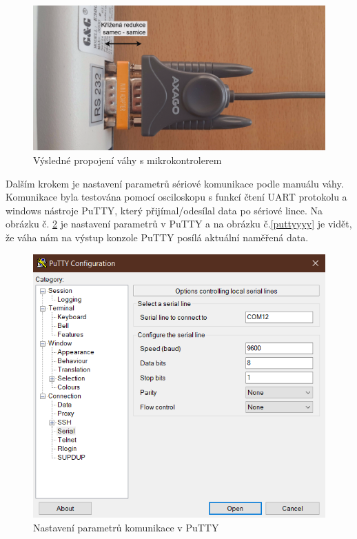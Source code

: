 \begin{figure}[H]
    \begin{center}
        \includegraphics[scale=0.27]{obrazky/zapojeni_vahy_v2 - popis.png}
    \end{center}
    \caption{Výsledné propojení váhy s mikrokontrolerem}
    \label{propojení váhy v2}
\end{figure}

Dalším krokem je nastavení parametrů sériové komunikace podle manuálu váhy\cite{vaha_datasheed}. Komunikace byla testována pomocí osciloskopu s funkcí čtení UART protokolu a windows nástroje PuTTY, který přijímal/odesílal data po sériové lince. 
Na obrázku č. \ref{putty} je nastavení parametrů v PuTTY a na obrázku č.\ref{puttyyyy} je vidět, že váha nám na výstup konzole PuTTY posílá aktuální naměřená data.


\begin{figure}[H]
    \begin{center}
        \includegraphics[scale=0.8]{obrazky/nastaveni putty.png}
    \end{center}
    \caption{Nastavení parametrů komunikace v PuTTY}
    \label{putty}
\end{figure}

